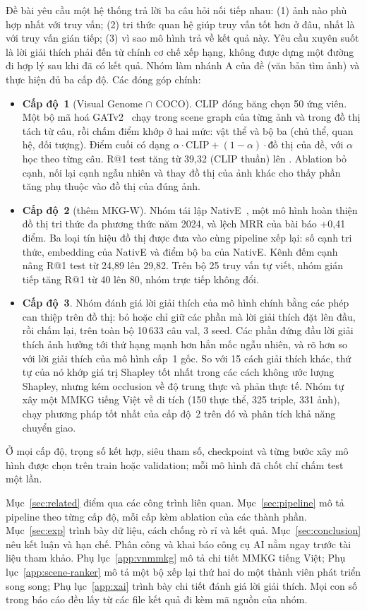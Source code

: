 Đề bài yêu cầu một hệ thống trả lời ba câu hỏi nối tiếp nhau:
(1) ảnh nào phù hợp nhất với truy vấn;
(2) tri thức quan hệ giúp truy vấn tốt hơn ở đâu, nhất là với truy vấn gián tiếp;
(3) vì sao mô hình trả về kết quả này.
Yêu cầu xuyên suốt là lời giải thích phải đến từ chính cơ chế xếp hạng, không được dựng một đường đi hợp lý sau khi đã có
kết quả. Nhóm làm nhánh A của đề (văn bản tìm ảnh) và thực hiện đủ ba cấp độ. Các đóng góp chính:
\begin{itemize}
\item \textbf{Cấp độ~1} (Visual Genome $\cap$ COCO). CLIP đóng băng chọn 50 ứng viên. Một bộ mã hoá
GATv2~\cite{brody2022gatv2} chạy trong scene graph của từng ảnh và trong đồ thị tách từ câu, rồi chấm điểm khớp ở hai mức:
vật thể và bộ ba (chủ thể, quan hệ, đối tượng). Điểm cuối có dạng $\alpha\cdot\text{CLIP} + (1-\alpha)\cdot\text{đồ thị}$
của đề, với $\alpha$ học theo từng câu. R@1 test tăng từ 39,32 (CLIP thuần) lên . Ablation bỏ cạnh, nối
lại cạnh ngẫu nhiên và thay đồ thị của ảnh khác cho thấy phần tăng phụ thuộc vào đồ thị của đúng ảnh.
\item \textbf{Cấp độ~2} (thêm MKG-W). Nhóm tái lập NativE~\cite{zhang2024native}, một mô hình hoàn thiện đồ thị tri thức
đa phương thức năm 2024, và lệch MRR của bài báo +0,41 điểm. Ba loại tín hiệu đồ thị được đưa vào cùng pipeline xếp lại:
số cạnh tri thức, embedding của NativE và điểm bộ ba của NativE. Kênh đếm cạnh nâng R@1 test từ 24,89 lên 29,82. Trên bộ
25 truy vấn tự viết, nhóm gián tiếp tăng R@1 từ 40 lên 80, nhóm trực tiếp không đổi.
\item \textbf{Cấp độ~3}. Nhóm đánh giá lời giải thích của mô hình chính bằng các phép can thiệp trên đồ thị: bỏ hoặc chỉ giữ
các phần mà lời giải thích đặt lên đầu, rồi chấm lại, trên toàn bộ 10\,633 câu val, 3 seed. Các phần đứng đầu lời
giải thích ảnh hưởng tới thứ hạng mạnh hơn hẳn mốc ngẫu nhiên, và rõ hơn so với lời giải thích của mô hình cấp~1 gốc. So với
15 cách giải thích khác, thứ tự của nó khớp giá trị Shapley tốt nhất trong các cách không ước lượng Shapley, nhưng kém
occlusion về độ trung thực và phản thực tế. Nhóm tự xây một MMKG tiếng Việt về di tích (150 thực thể, 325 triple, 331 ảnh), chạy phương pháp tốt nhất của
cấp độ~2 trên đó và phân tích khả năng chuyển giao.
\end{itemize}
Ở mọi cấp độ, trọng số kết hợp, siêu tham số, checkpoint và từng bước xây mô hình được chọn trên train hoặc validation;
mỗi mô hình đã chốt chỉ chấm test một lần.

Mục~\ref{sec:related} điểm qua các công trình liên quan. Mục~\ref{sec:pipeline} mô tả pipeline theo từng cấp độ, mỗi cấp
kèm ablation của các thành phần. Mục~\ref{sec:exp} trình bày dữ liệu, cách chống rò rỉ và kết quả. Mục~\ref{sec:conclusion}
nêu kết luận và hạn chế. Phân công và khai báo công cụ AI nằm ngay trước tài liệu tham khảo. Phụ lục~\ref{app:vnmmkg} mô tả
chi tiết MMKG tiếng Việt; Phụ lục~\ref{app:scene-ranker} mô tả một bộ xếp lại thứ hai do một thành viên phát triển song song;
Phụ lục~\ref{app:xai} trình bày chi tiết đánh giá lời giải thích.
Mọi con số trong báo cáo đều lấy từ các file kết quả đi kèm mã nguồn của nhóm.

